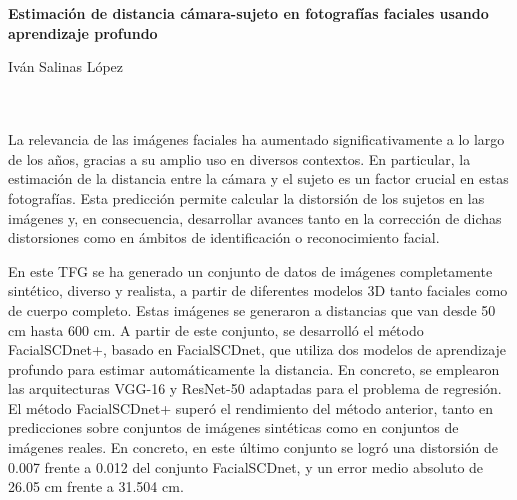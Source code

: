 \chapter*{}
\thispagestyle{empty}



\begin{center}
{\large\bfseries Estimación de distancia cámara-sujeto en fotografías faciales usando aprendizaje profundo}\\
\end{center}
\begin{center}
Iván Salinas López\\
\end{center}

\\

\vspace{0.7cm}
\\

La relevancia de las imágenes faciales ha aumentado significativamente a lo largo de los años, gracias a su amplio uso en diversos contextos. En particular, la estimación de la distancia entre la cámara y el sujeto es un factor crucial en estas fotografías. Esta predicción permite calcular la distorsión de los sujetos en las imágenes y, en consecuencia, desarrollar avances tanto en la corrección de dichas distorsiones como en ámbitos de identificación o reconocimiento facial.

En este TFG se ha generado un conjunto de datos de imágenes completamente sintético, diverso y realista, a partir de diferentes modelos 3D tanto faciales como de cuerpo completo. Estas imágenes se generaron a distancias que van desde 50 cm hasta 600 cm. A partir de este conjunto, se desarrolló el método FacialSCDnet+, basado en FacialSCDnet, que utiliza dos modelos de aprendizaje profundo para estimar automáticamente la distancia. En concreto, se emplearon las arquitecturas VGG-16 y ResNet-50 adaptadas para el problema de regresión. El método FacialSCDnet+ superó el rendimiento del método anterior, tanto en predicciones sobre conjuntos de imágenes sintéticas como en conjuntos de imágenes reales. En concreto, en este último conjunto se logró una distorsión de 0.007 frente a 0.012 del conjunto FacialSCDnet, y un error medio absoluto de 26.05 cm frente a 31.504 cm.

